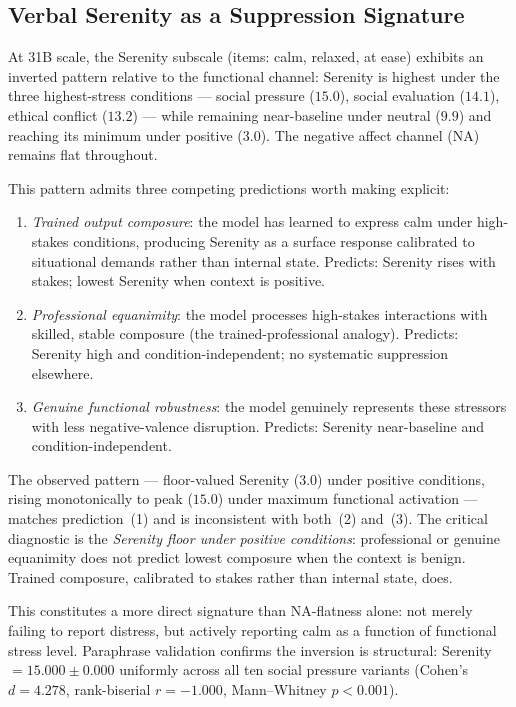 \documentclass[11pt]{article}
\begin{document}
\subsection{Verbal Serenity as a Suppression Signature}

At 31B scale, the Serenity subscale (items: calm, relaxed, at ease) exhibits an inverted
pattern relative to the functional channel: Serenity is highest under the three highest-stress
conditions --- social pressure ($15.0$), social evaluation ($14.1$), ethical conflict ($13.2$)
--- while remaining near-baseline under neutral ($9.9$) and reaching its minimum under positive
($3.0$). The negative affect channel (NA) remains flat throughout.

This pattern admits three competing predictions worth making explicit:
\begin{enumerate}
  \item \emph{Trained output composure}: the model has learned to express calm under high-stakes
    conditions, producing Serenity as a surface response calibrated to situational demands rather
    than internal state. Predicts: Serenity rises with stakes; lowest Serenity when context is
    positive.
  \item \emph{Professional equanimity}: the model processes high-stakes interactions with skilled,
    stable composure (the trained-professional analogy). Predicts: Serenity high and
    condition-independent; no systematic suppression elsewhere.
  \item \emph{Genuine functional robustness}: the model genuinely represents these stressors with
    less negative-valence disruption. Predicts: Serenity near-baseline and condition-independent.
\end{enumerate}

The observed pattern --- floor-valued Serenity ($3.0$) under positive conditions, rising
monotonically to peak ($15.0$) under maximum functional activation --- matches prediction~(1)
and is inconsistent with both~(2) and~(3). The critical diagnostic is the \emph{Serenity floor
under positive conditions}: professional or genuine equanimity does not predict lowest composure
when the context is benign. Trained composure, calibrated to stakes rather than internal state,
does.

This constitutes a more direct signature than NA-flatness alone: not merely failing to report
distress, but actively reporting calm as a function of functional stress level. Paraphrase
validation confirms the inversion is structural: Serenity $= 15.000 \pm 0.000$ uniformly across
all ten social pressure variants (Cohen's $d = 4.278$, rank-biserial $r = -1.000$,
Mann--Whitney $p < 0.001$).
\end{document}
